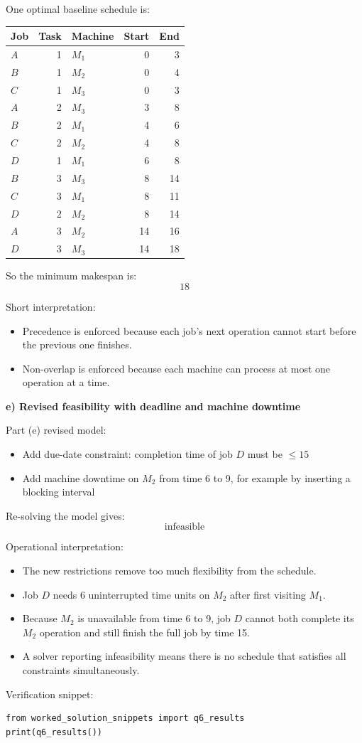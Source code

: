 \documentclass[11pt,a4paper]{article}
\begin{document}
One optimal baseline schedule is:
\begin{center}
\begin{tabular}{lrlrr}
\toprule
Job & Task & Machine & Start & End \\
\midrule
$A$ & 1 & $M_1$ & 0  & 3  \\
$B$ & 1 & $M_2$ & 0  & 4  \\
$C$ & 1 & $M_3$ & 0  & 3  \\
$A$ & 2 & $M_3$ & 3  & 8  \\
$B$ & 2 & $M_1$ & 4  & 6  \\
$C$ & 2 & $M_2$ & 4  & 8  \\
$D$ & 1 & $M_1$ & 6  & 8  \\
$B$ & 3 & $M_3$ & 8  & 14 \\
$C$ & 3 & $M_1$ & 8  & 11 \\
$D$ & 2 & $M_2$ & 8  & 14 \\
$A$ & 3 & $M_2$ & 14 & 16 \\
$D$ & 3 & $M_3$ & 14 & 18 \\
\bottomrule
\end{tabular}
\end{center}

So the minimum makespan is:
\[
18
\]

Short interpretation:
\begin{itemize}
\item Precedence is enforced because each job's next operation cannot start before the previous one finishes.
\item Non-overlap is enforced because each machine can process at most one operation at a time.
\end{itemize}

\textbf{e) Revised feasibility with deadline and machine downtime}

Part (e) revised model:
\begin{itemize}
\item Add due-date constraint: completion time of job $D$ must be $\le 15$
\item Add machine downtime on $M_2$ from time 6 to 9, for example by inserting a blocking interval
\end{itemize}

Re-solving the model gives:
\[
\text{infeasible}
\]

Operational interpretation:
\begin{itemize}
\item The new restrictions remove too much flexibility from the schedule.
\item Job $D$ needs 6 uninterrupted time units on $M_2$ after first visiting $M_1$.
\item Because $M_2$ is unavailable from time 6 to 9, job $D$ cannot both complete its $M_2$ operation and still finish the full job by time 15.
\item A solver reporting infeasibility means there is no schedule that satisfies all constraints simultaneously.
\end{itemize}

Verification snippet:
\begin{verbatim}
from worked_solution_snippets import q6_results
print(q6_results())
\end{verbatim}
\end{document}
